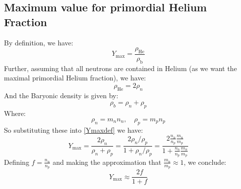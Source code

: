 \subsection{Maximum value for primordial Helium Fraction}
By definition, we have:
\begin{equation}\label{Ymaxdef}
    Y_{\text{max}} = \frac{\rho_{\text{He}}}{\rho_{\text{b}}}
\end{equation}
Further, assuming that all neutrons are contained in Helium (as we want the maximal primordial Helium fraction), we have:
\begin{equation}
    \rho_{\text{He}} = 2\rho_{n}
\end{equation}
And the Baryonic density is given by:
\begin{equation}
    \rho_b = \rho_n + \rho_p
\end{equation}
Where:
\begin{equation}
    \rho_n = m_nn_n, \quad \rho_p = m_pn_p
\end{equation}
So substituting these into \eqref{Ymaxdef} we have:
\begin{equation}
    Y_{\text{max}} = \frac{2\rho_n}{\rho_n + \rho_p} = \frac{2\rho_n/\rho_p}{1 + \rho_n/\rho_p} = \frac{2\frac{n_n}{n_p}\frac{m_n}{m_p}}{1 + \frac{n_n}{n_p}\frac{m_n}{m_p}}
\end{equation}
Defining $f = \frac{n_n}{n_p}$ and making the approximation that $\frac{m_n}{m_p} \approx 1$, we conclude:
\begin{equation}
    \boxed{Y_{\text{max}} \approx \frac{2f}{1 + f}}
\end{equation}

